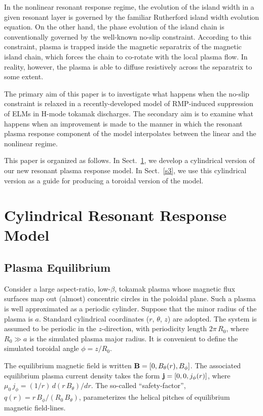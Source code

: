 \documentclass[12pt,prb,aps]{revtex4-1}
\begin{document}
In the nonlinear resonant response regime, the evolution of the island width in a given resonant layer is governed by the familiar Rutherford island width evolution equation.\cite{ruth,ruth1}
On the other hand, the phase evolution of the island chain is conventionally governed by the well-known no-slip constraint.\cite{rfa} According to this constraint,  plasma is trapped inside the
magnetic separatrix of the magnetic island chain,
which forces the chain to co-rotate with the local plasma flow. In reality, however, the plasma
is able to diffuse resistively across the separatrix to some extent.\cite{slip1,slip2} 

The primary aim of this paper is to investigate 
what happens when the no-slip constraint is relaxed in a recently-developed model of  RMP-induced
suppression of ELMs in H-mode tokamak discharges.\cite{rftor} The secondary aim is to examine what happens when an improvement is made to the manner in which the resonant
plasma response component of the model interpolates between the linear and the nonlinear regime. 

This paper is organized as follows. In Sect.~\ref{s2}, we develop a cylindrical version of
our new resonant plasma response model. In Sect.~\ref{s3},  we use this cylindrical version as a guide for producing a toroidal
version of the model.  

\section{Cylindrical Resonant Response Model}\label{s2}
\subsection{Plasma Equilibrium}
Consider a large aspect-ratio, low-$\beta$, tokamak plasma whose magnetic flux surfaces map out (almost)
concentric circles in the poloidal plane.
Such a plasma is well approximated as a periodic cylinder.  Suppose that the minor radius of the plasma
is $a$. Standard cylindrical coordinates ($r$, $\theta$, $z$) are adopted. The system is assumed to
be periodic in the $z$-direction, with periodicity length $2\pi\,R_0$, where $R_0\gg a$ is the simulated
plasma major radius. It is convenient to define the simulated toroidal angle $\phi=z/R_0$. 

The equilibrium magnetic field is written ${\bf B} = [0,B_\theta(r), B_\phi]$. The associated equilibrium
plasma current density takes the form ${\bf j} =[0,0,j_\phi(r)]$, where $\mu_0\,j_\phi= (1/r)\,d(r\,B_\theta)/dr$. The
so-called ``safety-factor'', $q(r)=r\,B_\phi/(R_0\,B_\theta)$, parameterizes the helical pitches of equilibrium magnetic
field-lines. 
\end{document}
